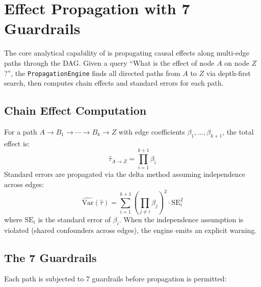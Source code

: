\documentclass{article}
\begin{document}
\section{Effect Propagation with 7 Guardrails}
\label{sec:propagation}

The core analytical capability of \oc{} is propagating causal effects along multi-edge paths through the DAG. Given a query ``What is the effect of node $A$ on node $Z$?'', the \texttt{PropagationEngine} finds all directed paths from $A$ to $Z$ via depth-first search, then computes chain effects and standard errors for each path.

\subsection{Chain Effect Computation}

For a path $A \to B_1 \to \cdots \to B_k \to Z$ with edge coefficients $\beta_1, \ldots, \beta_{k+1}$, the total effect is:
\begin{equation}
    \hat{\tau}_{A \to Z} = \prod_{i=1}^{k+1} \beta_i
\end{equation}
Standard errors are propagated via the delta method assuming independence across edges:
\begin{equation}
    \widehat{\text{Var}}(\hat{\tau}) = \sum_{i=1}^{k+1} \left(\prod_{j \neq i} \beta_j\right)^2 \cdot \text{SE}_i^2
    \label{eq:delta}
\end{equation}
where $\text{SE}_i$ is the standard error of $\beta_i$. When the independence assumption is violated (\eg shared confounders across edges), the engine emits an explicit warning.

\subsection{The 7 Guardrails}

Each path is subjected to 7 guardrails before propagation is permitted:
\end{document}
